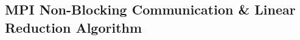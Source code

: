 \documentclass[12pt]{article}
\begin{document}

\subsection{MPI Non-Blocking Communication \& Linear Reduction Algorithm}
\end{document}
